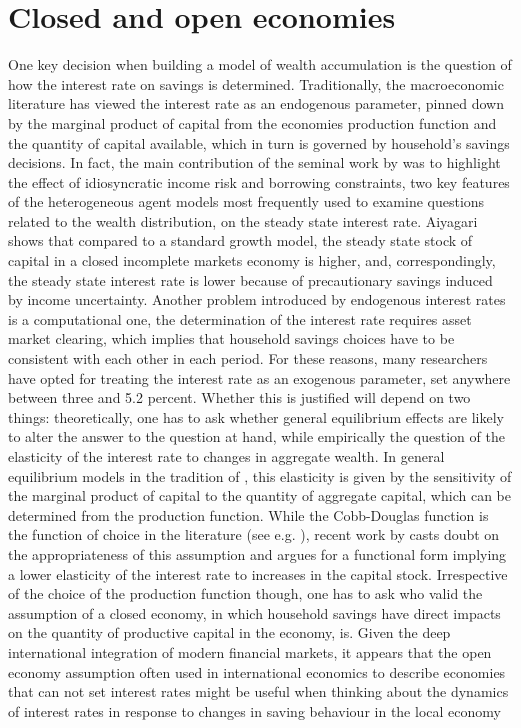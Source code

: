 \section{Closed and open economies}
One key decision when building a model of wealth accumulation is the question
of how the interest rate on savings is determined. Traditionally, the 
macroeconomic literature has viewed the interest rate as an endogenous parameter,
pinned down by the marginal product of capital from the economies production 
function and the quantity of capital available, which in turn is governed by 
household's savings decisions. In fact, the main contribution of the seminal 
work by \citet{Aiyagari1994} was to highlight the effect of idiosyncratic income
risk and borrowing constraints, two key features of the heterogeneous agent models
most frequently used to examine questions related to the wealth distribution,
on the steady state interest rate. Aiyagari shows that compared to a standard 
growth model, the steady state stock of capital in a closed incomplete markets
economy is higher, and, correspondingly, the steady state interest rate is lower
because of precautionary savings induced by income uncertainty.
Another problem introduced by endogenous interest rates is a computational one,
the determination of the interest rate requires asset market clearing, which 
implies that household savings choices have to be consistent with each other
in each period. 
For these reasons, many researchers have opted for treating the interest rate
as an exogenous parameter, set anywhere between three \citep{Cagetti2003} and
5.2 \citep{GourinchasParker2002} percent. Whether this is justified will depend
on two things: theoretically, one has to ask whether general equilibrium effects
are likely to alter the answer to the question at hand, while empirically the 
question of the elasticity of the interest rate to changes in aggregate wealth.
In general equilibrium models in the tradition of \cite{Aiyagari1994}, this 
elasticity is given by the sensitivity of the marginal product of capital to
the quantity of aggregate capital, which can be determined from the production 
function. While the Cobb-Douglas function is the function of choice in the 
literature (see e.g. \citealt{CastanedaRiosRull2003}), recent work by 
\citet{Piketty2014} casts doubt on the appropriateness of this assumption and 
argues for a functional form implying a lower elasticity of the interest rate
to increases in the capital stock. Irrespective of the choice of the production 
function though, one has to ask who valid the assumption of a closed economy, in 
which household savings have direct impacts on the quantity of productive capital
in the economy, is. Given the deep international integration of modern financial
markets, it appears that the open economy assumption often used in international
economics to describe economies that can not set interest rates might be useful
when thinking about the dynamics of interest rates in response to changes in 
saving behaviour in the local economy

